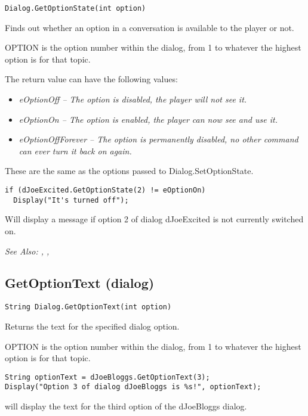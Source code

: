 \begin{verbatim}
Dialog.GetOptionState(int option)
\end{verbatim}
Finds out whether an option in a conversation is available to the player or
not.

OPTION is the option number within the dialog, from 1 to whatever the
highest option is for that topic.

The return value can have the following values:
\begin{itemize}
\item \it{eOptionOff} -- The option is disabled, the player will not see it.
\item \it{eOptionOn} -- The option is enabled, the player can now see and use it.
\item \it{eOptionOffForever} -- The option is permanently disabled, no other command can ever turn
  it back on again.
\end{itemize}
These are the same as the options passed to Dialog.SetOptionState.

\begin{verbatim}
if (dJoeExcited.GetOptionState(2) != eOptionOn)
  Display("It's turned off");
\end{verbatim}
Will display a message if option 2 of dialog dJoeExcited is not currently switched on.

\it{See Also:} ,
,


\subsection{GetOptionText (dialog)}\label{Dialog.GetOptionText}%

\begin{verbatim}
String Dialog.GetOptionText(int option)
\end{verbatim}
Returns the text for the specified dialog option.

OPTION is the option number within the dialog, from 1 to whatever the
highest option is for that topic.

\begin{verbatim}
String optionText = dJoeBloggs.GetOptionText(3);
Display("Option 3 of dialog dJoeBloggs is %s!", optionText);
\end{verbatim}
will display the text for the third option of the dJoeBloggs dialog.

